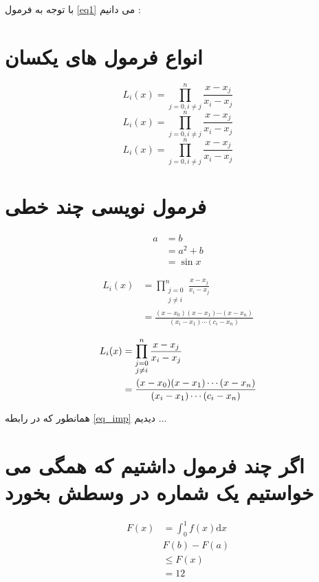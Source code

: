 \documentclass[12pt]{article}
\begin{document}
با توجه به فرمول 
\eqref{eq1}
می دانیم :
\section{انواع فرمول های یکسان}
\[
L_i(x) = \prod_{j=0,i \neq j}^{n} \frac{x-x_j}{x_i - x_j}
\]
$$
L_i(x) = \prod_{j=0,i \neq j}^{n} \frac{x-x_j}{x_i - x_j}
$$
\begin{equation*}
	L_i(x) = \prod_{j=0,i \neq j}^{n} \frac{x-x_j}{x_i - x_j}
\end{equation*}

\section{فرمول نویسی چند خطی}
\begin{align*}
a & = b \\
& =a^2+b\\
& =\sin x
\end{align*}

\begin{align*}
L_i(x) &= \prod_{\substack{j=0\\j \neq i}}^{n} \frac{x-x_j}{x_i-x_j} \\
& = \frac{(x-x_0)(x-x_1)\cdots (x-x_n)}{(x_i - x_1)\cdots (c_i - x_n)}
\end{align*}

\begin{align}
	L_i(x) &= \prod_{\substack{j=0\\j \neq i}}^{n} \frac{x-x_j}{x_i-x_j} \notag\\
	& = \frac{(x-x_0)(x-x_1)\cdots (x-x_n)}{(x_i - x_1)\cdots (c_i - x_n)}\label{eq_imp}
\end{align}

همانطور که در رابطه
\eqref{eq_imp} 
دیدیم ...

\section{اگر چند فرمول داشتیم که همگی می خواستیم یک شماره در وسطش بخورد}
\begin{equation}\label{eq_total}
\begin{split}
F(x) & = \int_0^1 f(x)\mathrm{d} x\\
& F(b) - F(a)\\
& \le F(x) \\
& = 12
\end{split}
\end{equation}
\end{document}
